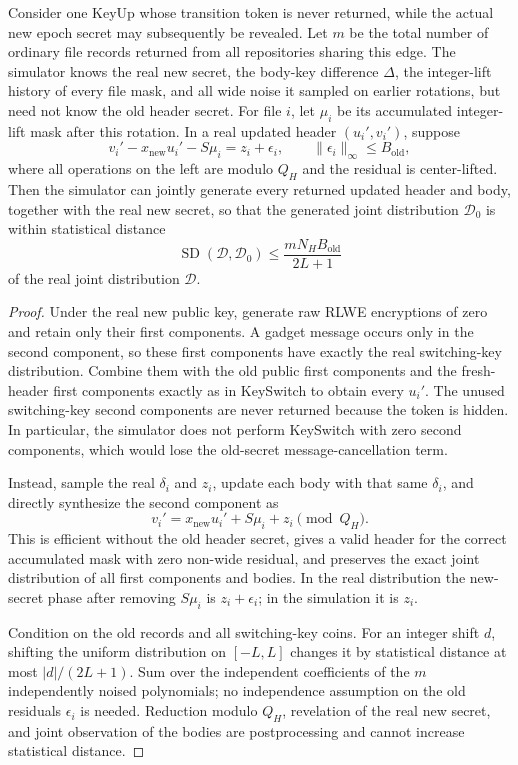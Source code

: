 \begin{lemma}
\label{lem:hidden-rotation}
Consider one KeyUp whose transition token is never returned, while the actual new epoch secret may subsequently be revealed. Let $m$ be the total number of ordinary file records returned from all repositories sharing this edge. The simulator knows the real new secret, the body-key difference $\Delta$, the integer-lift history of every file mask, and all wide noise it sampled on earlier rotations, but need not know the old header secret. For file $i$, let $\mu_i$ be its accumulated integer-lift mask after this rotation. In a real updated header $(u_i',v_i')$, suppose
\[
 v_i'-x_{\mathrm{new}}u_i'-S\mu_i=z_i+\epsilon_i,
 \qquad \|\epsilon_i\|_\infty\le B_{\mathrm{old}},
\]
where all operations on the left are modulo $Q_H$ and the residual is center-lifted. Then the simulator can jointly generate every returned updated header and body, together with the real new secret, so that the generated joint distribution $\mathcal D_0$ is within statistical distance
\[
 \operatorname{SD}(\mathcal D,\mathcal D_0)\le
 \frac{mN_H B_{\mathrm{old}}}{2L+1}
\]
of the real joint distribution $\mathcal D$.
\end{lemma}
\begin{proof}
Under the real new public key, generate raw RLWE encryptions of zero and retain only their first components. A gadget message occurs only in the second component, so these first components have exactly the real switching-key distribution. Combine them with the old public first components and the fresh-header first components exactly as in KeySwitch to obtain every $u_i'$. The unused switching-key second components are never returned because the token is hidden. In particular, the simulator does not perform KeySwitch with zero second components, which would lose the old-secret message-cancellation term.

Instead, sample the real $\delta_i$ and $z_i$, update each body with that same $\delta_i$, and directly synthesize the second component as
\[
 v_i'=x_{\mathrm{new}}u_i'+S\mu_i+z_i\pmod{Q_H}.
\]
This is efficient without the old header secret, gives a valid header for the correct accumulated mask with zero non-wide residual, and preserves the exact joint distribution of all first components and bodies. In the real distribution the new-secret phase after removing $S\mu_i$ is $z_i+\epsilon_i$; in the simulation it is $z_i$.

Condition on the old records and all switching-key coins. For an integer shift $d$, shifting the uniform distribution on $[-L,L]$ changes it by statistical distance at most $|d|/(2L+1)$. Sum over the independent coefficients of the $m$ independently noised polynomials; no independence assumption on the old residuals $\epsilon_i$ is needed. Reduction modulo $Q_H$, revelation of the real new secret, and joint observation of the bodies are postprocessing and cannot increase statistical distance.
\end{proof}


